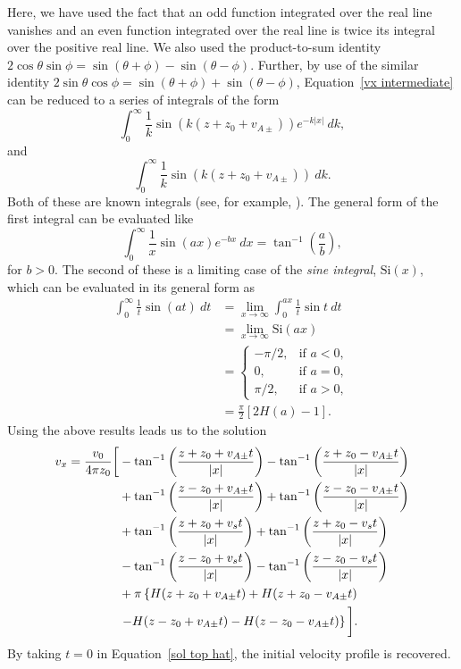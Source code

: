 Here, we have used the fact that an odd function integrated over the real line vanishes and an even function integrated over the real line is twice its integral over the positive real line. We also used the product-to-sum identity $2\cos{\theta}\sin{\phi} = \sin(\theta + \phi) - \sin(\theta - \phi)$. Further, by use of the similar identity $2\sin{\theta}\cos{\phi} = \sin(\theta + \phi) + \sin(\theta - \phi)$, Equation~\eqref{vx intermediate} can be reduced to a series of integrals of the form
\begin{equation}
\int_{0}^{\infty} \frac{1}{k}\sin(k(z + z_0 + v_{A\pm}))e^{-k|x|} ~dk,
\end{equation}
and
\begin{equation}
\int_{0}^{\infty} \frac{1}{k}\sin(k(z + z_0 + v_{A\pm})) ~dk.
\end{equation}
Both of these are known integrals (see, for example, \citealp{abr_etal65}). The general form of the first integral can be evaluated like
\begin{equation}
\int_{0}^{\infty} \frac{1}{x}\sin(ax) e^{-bx} ~dx = \tan^{-1}\left(\frac{a}{b}\right),
\end{equation}
for $b > 0$. The second of these is a limiting case of the \textit{sine integral}, $\mathrm{Si}(x)$, which can be evaluated in its general form as
\begin{align}
\int_{0}^{\infty} \frac{1}{t}\sin(at) ~dt &= \lim_{x \to \infty}\int_{0}^{ax} \frac{1}{t}\sin{t} ~dt \\
&= \lim_{x \to \infty} \mathrm{Si}(ax)  \\
&=
\begin{cases}
-\pi/2, &\text{if  } a < 0, \\
0, &\text{if  } a = 0, \\
\pi/2, &\text{if  } a > 0,
\end{cases} \\
&= \frac{\pi}{2} \left[2H(a) - 1\right].
\end{align}
Using the above results leads us to the solution
\begin{align}
v_x = \frac{v_0}{4\pi z_0} \bigg[ &-\tan^{-1}\left( \frac{z + z_0 + v_{A\pm}t}{|x|} \right) - \tan^{-1}\left( \frac{z + z_0 - v_{A\pm}t}{|x|} \right)  \notag \\
&+ \tan^{-1}\left( \frac{z - z_0 + v_{A\pm}t}{|x|} \right) + \tan^{-1}\left( \frac{z - z_0 - v_{A\pm}t}{|x|} \right) \notag \\
&+ \tan^{-1}\left( \frac{z + z_0 + v_st}{|x|} \right) + \tan^{-1}\left( \frac{z + z_0 - v_st}{|x|} \right) \notag \\
&- \tan^{-1}\left( \frac{z - z_0 + v_st}{|x|} \right) - \tan^{-1}\left( \frac{z - z_0 - v_st}{|x|} \right) \notag \\
&+ \pi \left\{ H(z + z_0 + v_{A\pm}t) + H(z + z_0 - v_{A\pm}t) \right.  \notag \\
&\left. - H(z - z_0 + v_{A\pm}t) - H(z - z_0 - v_{A\pm}t) \right\} \bigg]. \label{sol top hat}
\end{align}
By taking $t = 0$ in Equation~\eqref{sol top hat}, the initial velocity profile is recovered.

